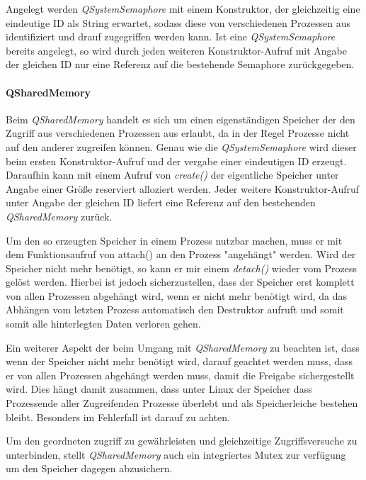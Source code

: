 Angelegt werden \emph{QSystemSemaphore}  mit einem Konstruktor, der gleichzeitig eine eindeutige ID als String erwartet, sodass diese von verschiedenen Prozessen aus identifiziert und drauf zugegriffen werden kann. Ist eine \emph{QSystemSemaphore} bereits angelegt, so wird durch jeden weiteren Konstruktor-Aufruf mit Angabe der gleichen ID nur eine Referenz auf die bestehende Semaphore zurückgegeben.
 
\paragraph{QSharedMemory}
Beim \emph{QSharedMemory} handelt es sich um einen eigenständigen Speicher der den Zugriff aus verschiedenen Prozessen aus erlaubt, da in der Regel Prozesse nicht auf den anderer zugreifen können. Genau wie die \emph{QSystemSemaphore} wird dieser beim ersten Konstruktor-Aufruf und der vergabe einer eindeutigen ID erzeugt. Daraufhin kann mit einem Aufruf von \emph{create()} der eigentliche Speicher unter Angabe einer Größe reserviert alloziert werden. Jeder weitere Konstruktor-Aufruf unter Angabe der gleichen ID liefert eine Referenz auf den bestehenden \emph{QSharedMemory} zurück.

Um den so erzeugten Speicher in einem Prozess nutzbar machen, muss er mit dem Funktionsaufruf von attach() an den Prozess "angehängt" werden. Wird der Speicher nicht mehr benötigt, so kann er mir einem \emph{detach()} wieder vom Prozess gelöst werden. Hierbei ist jedoch sicherzustellen, dass der Speicher erst komplett von allen Prozessen abgehängt wird, wenn er nicht mehr benötigt wird, da das Abhängen vom letzten Prozess automatisch den Destruktor aufruft und somit somit alle hinterlegten Daten verloren gehen.

Ein weiterer Aspekt der beim Umgang mit \emph{QSharedMemory} zu beachten ist, dass wenn der Speicher nicht mehr benötigt wird, darauf geachtet werden muss, dass er von allen Prozessen abgehängt werden muss, damit die Freigabe sichergestellt wird. Dies hängt damit zusammen, dass unter Linux der Speicher dass Prozessende aller Zugreifenden Prozesse überlebt und als Speicherleiche bestehen bleibt. Besonders im Fehlerfall ist darauf zu achten.

Um den geordneten zugriff zu gewährleisten und gleichzeitige Zugriffsversuche zu unterbinden, stellt \emph{QSharedMemory} auch ein integriertes Mutex zur verfügung um den Speicher dagegen abzusichern. 

